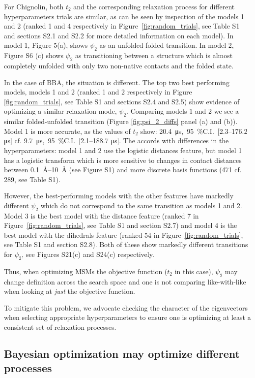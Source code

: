 \documentclass[journal=jacsat,manuscript=article]{achemso}
\newcommand{\SIci}[4]{\SI{#1}{#4},\ \SI{95}{\percent}C.I.\ [\numrange[range-phrase=---]{#2}{#3} \si{#4}]}
\begin{document}
For Chignolin, both $t_2$ and the corresponding relaxation process for different hyperparameters trials are similar, as can be seen by inspection of the models 1 and 2 (ranked 1 and 4 respectively in Figure~\ref{fig:random_trials}, see Table S1 and sections S2.1 and S2.2 for more detailed information on each model).  In model 1, Figure 5(a), shows $\psi_2$ as an unfolded-folded transition.  In model 2, Figure S6 (c) shows $\psi_2$ as transitioning between a structure which is almost completely unfolded with only two non-native contacts and the folded state. 

In the case of BBA, the situation is different. The top two best performing models, models 1 and 2 (ranked 1 and 2 respectively in Figure \ref{fig:random_trials}, see Table S1 and sections S2.4 and S2.5) show evidence of optimizing a similar relaxation mode, $\psi_2$.  Comparing models 1 and 2 we see a similar folded-unfolded transition (Figure \ref{fig:psi_2_diffs} panel (a) and (b)). Model 1 is more accurate, as the values of $t_2$ show: \SIci{20.4}{2.3}{176.2}{\micro\second} cf. \SIci{9.7}{2.1}{188.7}{\micro\second}. The accords with differences in the hyperparameters: model 1 and 2 use the logistic distances feature, but model 1 has a logistic transform which is more sensitive to changes in contact distances between \SIrange[range-phrase=---]{0.1}{10}{\angstrom} (see Figure S1) and more discrete basis functions (471 cf. 289, see Table S1).  

However, the best-performing models with the other features have markedly different $\psi_2$ which do not correspond to the same transition as models 1 and 2.  Model 3 is the best model with the distance feature (ranked 7 in Figure~\ref{fig:random_trials}, see Table S1 and section S2.7) and model 4 is the best model with the dihedrals feature (ranked 54 in Figure~\ref{fig:random_trials}, see Table S1 and section S2.8). Both of these show markedly different transitions for $\psi_2$, see Figures S21(c) and S24(c) respectively. 

Thus, when optimizing MSMs the objective function ($t_2$ in this case), $\psi_2$ may change definition across the search space and one is not comparing like-with-like when looking at \emph{just} the objective function.  

To mitigate this problem, we advocate checking the character of the eigenvectors when selecting appropriate hyperparameters to ensure one is optimizing at least a consistent set of relaxation processes.  

\subsection{Bayesian optimization may optimize different processes}
\end{document}
